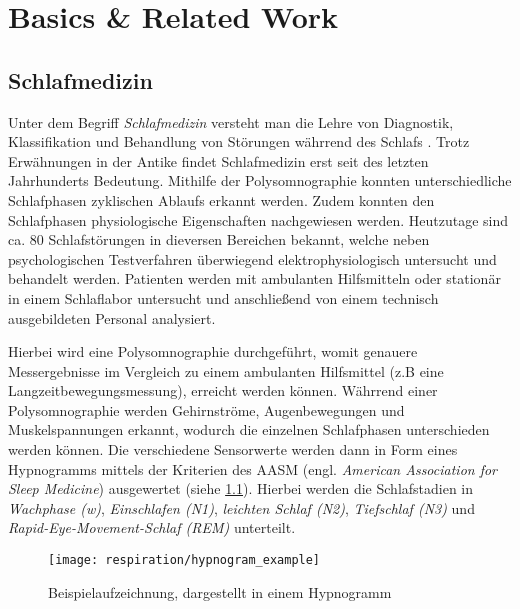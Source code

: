 
\chapter{Basics \& Related Work}
\label{ch:Basics}

\section{Schlafmedizin}
\label{ch:Basics:se:schlafmedizin}
Unter dem Begriff \textit{Schlafmedizin} versteht man die Lehre von Diagnostik, Klassifikation und Behandlung von Störungen währrend des Schlafs \cite{schlafmedizin_1x1}. 
Trotz Erwähnungen in der Antike findet Schlafmedizin erst seit des letzten Jahrhunderts Bedeutung.
Mithilfe der Polysomnographie konnten unterschiedliche Schlafphasen zyklischen Ablaufs erkannt werden.
Zudem konnten den Schlafphasen physiologische Eigenschaften nachgewiesen werden.
Heutzutage sind ca. 80 Schlafstörungen in dieversen Bereichen bekannt, welche neben psychologischen Testverfahren überwiegend elektrophysiologisch untersucht und behandelt werden.
Patienten werden mit ambulanten Hilfsmitteln oder stationär in einem Schlaflabor untersucht und anschließend von einem technisch ausgebildeten Personal analysiert.

Hierbei wird eine Polysomnographie durchgeführt, womit genauere Messergebnisse im Vergleich zu einem ambulanten Hilfsmittel (z.B eine Langzeitbewegungsmessung), erreicht werden können.
Währrend einer Polysomnographie werden Gehirnströme, Augenbewegungen und Muskelspannungen erkannt, wodurch die einzelnen Schlafphasen unterschieden werden können.
Die verschiedene Sensorwerte werden dann in Form eines Hypnogramms mittels der Kriterien des AASM (engl. \textit{American Association for Sleep Medicine}) ausgewertet (siehe \ref{hypnogram_example}). 
Hierbei werden die Schlafstadien in \textit{Wachphase (w)}, \textit{Einschlafen (N1)}, \textit{leichten Schlaf (N2)}, \textit{Tiefschlaf (N3)} und \textit{Rapid-Eye-Movement-Schlaf (REM)} unterteilt.

\begin{figure}[ht]
    \centering
    \texttt{[image: respiration/hypnogram\_example]}
    \caption{Beispielaufzeichnung, dargestellt in einem Hypnogramm \cite{praxis_der_schlafmedizin}}
    \label{hypnogram_example}
\end{figure}

